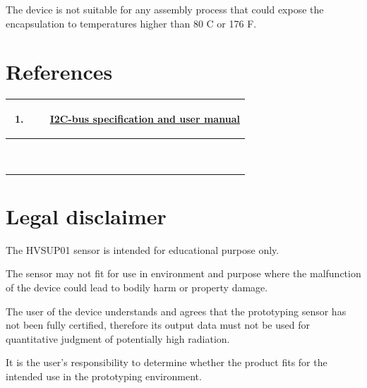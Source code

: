 \documentclass[a4paper]{article}
\newcommand\liststyleLii{%
\renewcommand\theenumi{\arabic{enumi}}
\renewcommand\theenumii{\arabic{enumii}}
\renewcommand\theenumiii{\arabic{enumiii}}
\renewcommand\theenumiv{\arabic{enumiv}}
\renewcommand\labelenumi{\theenumi.}
\renewcommand\labelenumii{\theenumii.}
\renewcommand\labelenumiii{\theenumiii.}
\renewcommand\labelenumiv{\theenumiv.}
}
\begin{document}
{
The device is not suitable for any assembly process that could expose the encapsulation to temperatures higher than 80
{\textdegree}C or 176 {\textdegree}F.}

\clearpage\section[References]{ References}
\hypertarget{RefHeadingToc9651801770043}{}\begin{flushleft}
\tablefirsthead{}
\tablehead{}
\tabletail{}
\tablelasttail{}
\begin{supertabular}{|m{0.7330598in}|m{6.03236in}|}
\hline
\liststyleLii
\begin{enumerate}
\item ~

\end{enumerate}
 &
{ \href{https://www.nxp.com/docs/en/user-guide/UM10204.pdf}{\foreignlanguage{english}{I2C-bus
specification and user manual}}}\\\hline
~
 &
~
\\\hline
~
 &
~
\\\hline
\end{supertabular}
\end{flushleft}
\section[]{ }
\clearpage\section[Legal disclaimer]{ Legal disclaimer}
\hypertarget{RefHeadingToc1811383566216}{}{
The HVSUP01 sensor is intended for educational purpose only. }

{
The sensor may not fit for use in environment and purpose where the malfunction of the device could lead to bodily harm
or property damage. }

{
The user of the device understands and agrees that the prototyping sensor has not been fully certified, therefore its output data
must not be used for quantitative judgment of potentially high radiation. }

{
It is the user's responsibility to determine whether the product fits for the intended use in the prototyping
environment.}
\end{document}

